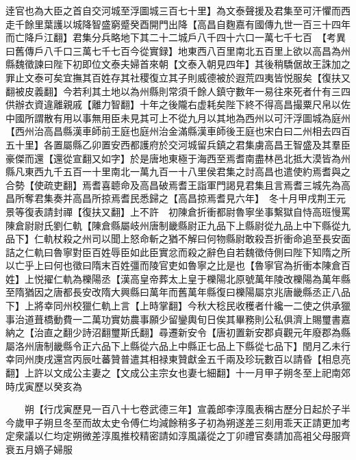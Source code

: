 逹官也為大臣之首自交河城至浮圖城三百七十里】為文泰聲援及君集至可汗懼而西走千餘里葉護以城降智盛窮蹙癸酉開門出降【高昌自麴嘉有國傳九世一百三十四年而亡降戶江翻】君集分兵略地下其二十二城戶八千四十六口一萬七千七百　【考異曰舊傳戶八千口三萬七千七百今從實録】地東西八百里南北五百里上欲以高昌為州縣魏徵諫曰陛下初即位文泰夫婦首來朝【文泰入朝見四年】其後稍驕倨故王誅加之罪止文泰可矣宜撫其百姓存其社稷復立其子則威德被於遐荒四夷皆悦服矣【復扶又翻被皮義翻】今若利其土地以為州縣則常須千餘人鎮守數年一易往來死者什有三四供辦衣資違離親戚【離力智翻】十年之後隴右虚耗矣陛下終不得高昌撮粟尺帛以佐中國所謂散有用以事無用臣未見其可上不從九月以其地為西州以可汗浮圖城為庭州【西州治高昌縣漢車師前王庭也庭州治金滿縣漢車師後王庭也宋白曰二州相去四百五十里】各置屬縣乙卯置安西都護府於交河城留兵鎮之君集虜高昌王智盛及其羣臣豪傑而還【還從宣翻又如字】於是唐地東極于海西至焉耆南盡林邑北抵大漠皆為州縣凡東西九千五百一十里南北一萬九百一十八里侯君集之討高昌也遣使約焉耆與之合勢【使疏吏翻】焉耆喜聼命及高昌破焉耆王詣軍門謁見君集且言焉耆三城先為高昌所奪君集奏并高昌所掠焉耆民悉歸之【高昌掠焉耆見六年】　冬十月甲戌荆王元景等復表請封禪【復扶又翻】上不許　初陳倉折衝都尉魯寧坐事繫獄自恃高班慢罵陳倉尉尉氏劉仁軌【陳倉縣屬岐州唐制畿縣尉正九品下上縣尉從九品上中下縣從九品下】仁軌杖殺之州司以聞上怒命斬之猶不解曰何物縣尉敢殺吾折衝命追至長安面詰之仁軌曰魯寧對臣百姓辱臣如此臣實忿而殺之辭色自若魏徵侍側曰陛下知隋之所以亡乎上曰何也徵曰隋末百姓彊而陵官吏如魯寧之比是也【魯寧官為折衝本陳倉百姓】上悦擢仁軌為櫟陽丞【漢高皇帝葬太上皇于櫟陽北原號萬年陵改櫟陽為萬年縣至隋猶因之唐都長安改隋大興縣曰萬年而舊萬年縣復曰櫟陽屬京兆唐畿縣丞正八品下】上將幸同州校獵仁軌上言【上時掌翻】今秋大稔民收穫者什纔一二使之供承獵事治道葺橋動費一二萬功實妨農事願少留鑾輿旬日俟其畢務則公私俱濟上賜璽書嘉納之【治直之翻少詩沼翻璽斯氏翻】尋遷新安令【唐初置新安郡貞觀元年廢郡為縣屬洛州唐制畿縣令正六品下上縣從六品上中縣正七品上下縣從七品下】閏月乙未行幸同州庚戌還宫丙辰吐蕃贊普遣其相禄東贊獻金五千兩及珍玩數百以請昏【相息亮翻】上許以文成公主妻之【文成公主宗女也妻七細翻】十一月甲子朔冬至上祀南郊時戊寅歷以癸亥為

　　朔【行戊寅歷見一百八十七卷武德三年】宣義郎李淳風表稱古歷分日起於子半今歲甲子朔旦冬至而故太史令傅仁均減餘稍多子初為朔遂差三刻用乖天正請更加考定衆議以仁均定朔微差淳風推校精密請如淳風議從之丁卯禮官奏請加高袓父母服齊衰五月嫡子婦服

